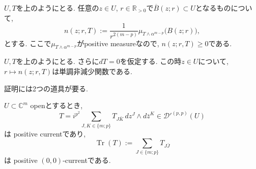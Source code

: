\begin{tcolorbox}[mybox]
\begin{defn}
\label{defn-H-5.9}
$U, T$を上のようにとる. 
任意の$z\in U$, $r\in\mathbb{R}_{>0}$で$\overline{B}(z;r)\subset U$となるものについて, 
\begin{equation*}
n(z;r,T)
:=
\frac{1}{r^{2(m-p)}}
\mu_{T\wedge\alpha^{m-p}}\bigl(B(z;r)\bigr),
\end{equation*}
とする. 
ここで$\mu_{T\wedge\alpha^{m-p}}$がpositive measureなので, $n(z;r,T)\geq 0$である. 
\end{defn}
\end{tcolorbox}


\begin{tcolorbox}[mybox]
\begin{thm}
\label{thm-H-5.10}
$U, T$を上のようにとる. さらに$dT=0$を仮定する. 
この時$z\in U$について, $r\longmapsto n(z;r,T)$は単調非減少関数である.
\end{thm}
\end{tcolorbox}

証明には2つの道具が要る.

\begin{tcolorbox}[mybox]
\begin{lem}
\label{lem-H-5.11}
$U\subset\mathbb{C}^m$ openとするとき, 
\begin{equation*}
T=i^{p^2}\sum_{J,K\in\{m;p\}}T_{J\bar K}\,dz^J\wedge d\bar z^K
\in\mathcal{D}'^{(p,p)}(U)
\end{equation*}
は positive currentであり, 
\begin{equation*}
\operatorname{Tr}(T):=\sum_{J\in\{m;p\}}T_{J\bar J}
\end{equation*}
は positive $(0,0)$-currentである. 
\end{lem}
\end{tcolorbox}

